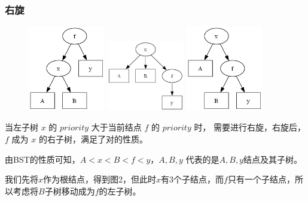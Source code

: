 \documentclass[utf8]{ctexbeamer}
\begin{document}
    \begin{frame}
        \frametitle{右旋}

        \begin{figure}
            \includegraphics[width=0.3\textwidth]{images/right_rotate0.png}
            \includegraphics[width=0.3\textwidth]{images/right_rotate1.png}
            \includegraphics[width=0.3\textwidth]{images/right_rotate2.png}
        \end{figure}
        当左子树 $x$ 的 $priority$ 大于当前结点 $f$ 的 $priority$ 时，
        需要进行右旋，右旋后，$f$ 成为 $x$ 的右子树，满足了对的性质。

        由BST的性质可知，$A < x < B < f < y$，$A, B, y$ 代表的是$A, B, y$结点及其子树。
        
        我们先将$x$作为根结点，得到图2，但此时$x$有$3$个子结点，而$f$只有一个子结点，所以考虑将$B$子树移动成为$f$的左子树。    
    \end{frame}
\end{document}
